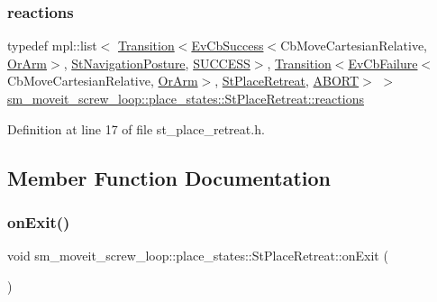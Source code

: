 \subsubsection{\texorpdfstring{reactions}{reactions}}
{\footnotesize\ttfamily typedef mpl\+::list$<$ \hyperlink{classsmacc_1_1Transition}{Transition}$<$\hyperlink{structsmacc_1_1EvCbSuccess}{Ev\+Cb\+Success}$<$Cb\+Move\+Cartesian\+Relative, \hyperlink{classsm__moveit__screw__loop_1_1OrArm}{Or\+Arm}$>$, \hyperlink{structsm__moveit__screw__loop_1_1place__states_1_1StNavigationPosture}{St\+Navigation\+Posture}, \hyperlink{structsmacc_1_1default__transition__tags_1_1SUCCESS}{S\+U\+C\+C\+E\+SS}$>$, \hyperlink{classsmacc_1_1Transition}{Transition}$<$\hyperlink{structsmacc_1_1EvCbFailure}{Ev\+Cb\+Failure}$<$Cb\+Move\+Cartesian\+Relative, \hyperlink{classsm__moveit__screw__loop_1_1OrArm}{Or\+Arm}$>$, \hyperlink{structsm__moveit__screw__loop_1_1place__states_1_1StPlaceRetreat}{St\+Place\+Retreat}, \hyperlink{structsmacc_1_1default__transition__tags_1_1ABORT}{A\+B\+O\+RT}$>$ $>$ \hyperlink{structsm__moveit__screw__loop_1_1place__states_1_1StPlaceRetreat_ad808a89770222f7f63363f28bd92056c}{sm\+\_\+moveit\+\_\+screw\+\_\+loop\+::place\+\_\+states\+::\+St\+Place\+Retreat\+::reactions}}



Definition at line 17 of file st\+\_\+place\+\_\+retreat.\+h.



\subsection{Member Function Documentation}
\mbox{\label{structsm__moveit__screw__loop_1_1place__states_1_1StPlaceRetreat_a14f697586afa2be8f3654928f8f492e1}} 
\subsubsection{\texorpdfstring{on\+Exit()}{onExit()}}
{\footnotesize\ttfamily void sm\+\_\+moveit\+\_\+screw\+\_\+loop\+::place\+\_\+states\+::\+St\+Place\+Retreat\+::on\+Exit (\begin{DoxyParamCaption}{ }\end{DoxyParamCaption})\hspace{0.3cm}{\ttfamily [inline]}}



